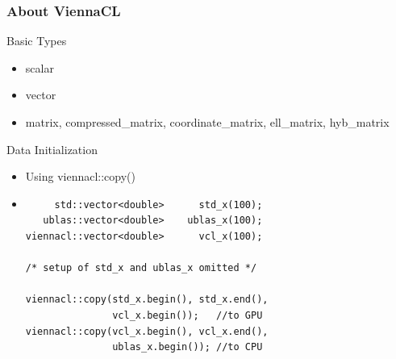 \begin{frame}[fragile]
\frametitle{About ViennaCL}

 \begin{block}{Basic Types}
   \begin{itemize}
    \item scalar
    \item vector
    \item matrix, compressed\_matrix, coordinate\_matrix, ell\_matrix, hyb\_matrix
   \end{itemize}
 \end{block}

 \begin{block}{Data Initialization}
    \begin{itemize}
     \item Using viennacl::copy() 
    \item  { \black
  \begin{lstlisting}
     std::vector<double>      std_x(100);
   ublas::vector<double>    ublas_x(100);
viennacl::vector<double>      vcl_x(100);

/* setup of std_x and ublas_x omitted */

viennacl::copy(std_x.begin(), std_x.end(),
               vcl_x.begin());   //to GPU
viennacl::copy(vcl_x.begin(), vcl_x.end(),
               ublas_x.begin()); //to CPU
  \end{lstlisting} }

 \end{itemize}

 \end{block}
\end{frame}


